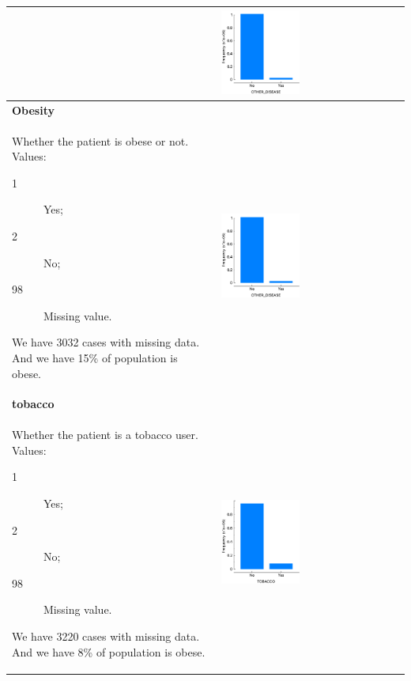 \begin{longtable}{P{0.45\textwidth}P{0.45\textwidth}}
& \includegraphics[width=0.44\textwidth]{img/appendix/feature_otherdisease.png} 
\\ \hline
\textbf{Obesity} & \\
Whether the patient is obese or not. Values:
\begin{description}
    \item[1] Yes;
    \item[2] No;
    \item[98] Missing value.
\end{description}
We have 3032 cases with missing data.
And we have 15\% of population is obese.
& \includegraphics[width=0.44\textwidth]{img/appendix/feature_otherdisease.png} 
\\ \hline
\textbf{tobacco} & \\
Whether the patient is a tobacco user. Values:
\begin{description}
    \item[1] Yes;
    \item[2] No;
    \item[98] Missing value.
\end{description}
We have 3220 cases with missing data.
And we have 8\% of population is obese.
& \includegraphics[width=0.44\textwidth]{img/appendix/feature_tobacco.png} 

\end{longtable}
